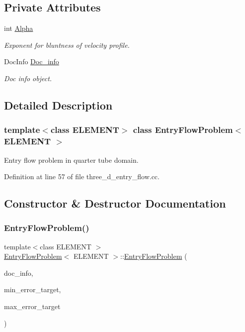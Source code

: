 \subsection*{Private Attributes}
\begin{DoxyCompactItemize}
\item 
int \hyperlink{classEntryFlowProblem_a4b69957951a6367b12bf02c1a8d9ad2a}{Alpha}
\begin{DoxyCompactList}\small\item\em Exponent for bluntness of velocity profile. \end{DoxyCompactList}\item 
Doc\+Info \hyperlink{classEntryFlowProblem_abf50dd060db0e4c31628cfd228e096b8}{Doc\+\_\+info}
\begin{DoxyCompactList}\small\item\em Doc info object. \end{DoxyCompactList}\end{DoxyCompactItemize}


\subsection{Detailed Description}
\subsubsection*{template$<$class E\+L\+E\+M\+E\+NT$>$\newline
class Entry\+Flow\+Problem$<$ E\+L\+E\+M\+E\+N\+T $>$}

Entry flow problem in quarter tube domain. 

Definition at line 57 of file three\+\_\+d\+\_\+entry\+\_\+flow.\+cc.



\subsection{Constructor \& Destructor Documentation}
\mbox{\label{classEntryFlowProblem_a0d527811321d270d769224dcbac8d240}} 
\subsubsection{\texorpdfstring{Entry\+Flow\+Problem()}{EntryFlowProblem()}}
{\footnotesize\ttfamily template$<$class E\+L\+E\+M\+E\+NT $>$ \\
\hyperlink{classEntryFlowProblem}{Entry\+Flow\+Problem}$<$ E\+L\+E\+M\+E\+NT $>$\+::\hyperlink{classEntryFlowProblem}{Entry\+Flow\+Problem} (\begin{DoxyParamCaption}\item[{Doc\+Info \&}]{doc\+\_\+info,  }\item[{const double \&}]{min\+\_\+error\+\_\+target,  }\item[{const double \&}]{max\+\_\+error\+\_\+target }\end{DoxyParamCaption})}



